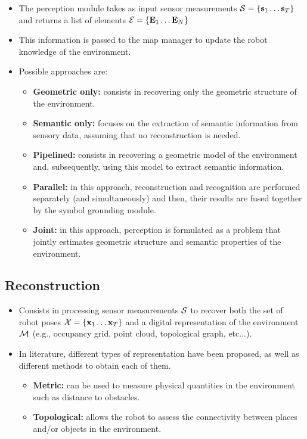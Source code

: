 \documentclass{article}
\begin{document}
%	

	\begin{itemize}
		\item The perception module takes as input sensor measurements $\mathcal{S} = \{ \mathbf{s}_1 \dots \mathbf{s}_T \}$ and returns a list of elements $\mathcal{E} = \{ \mathbf{E}_1 \dots \mathbf{E}_N \}$
		
		\item This information is passed to the map manager to update the robot knowledge of the environment.
		
		\item 	Possible approaches are:
		\begin{itemize}
			\item {\bf Geometric only:} consists in recovering only the geometric structure of the environment.
			\item {\bf Semantic only:} focuses on the extraction of semantic information from sensory data, assuming that no reconstruction is needed.
			\item {\bf Pipelined:} consists in recovering a geometric model of the environment and, subsequently, using this model to extract semantic information.
			\item {\bf Parallel:} in this approach, reconstruction and recognition are performed separately (and simultaneously) and then, their results are fused together by the symbol grounding module.
			\item {\bf Joint:} in this approach, perception is formulated as a problem that jointly estimates geometric structure and semantic properties of the environment. 
		\end{itemize}
	\end{itemize}
	
	\subsection{Reconstruction}

	\begin{itemize}
		\item Consists in processing sensor measurements $\mathcal{S}$ to recover both the set of robot poses $\mathcal{X} = \{ \mathbf{x}_1 \dots \mathbf{x}_T \}$ and a digital representation of the environment $\mathcal{M}$ (e.g., occupancy grid, point cloud, topological graph, etc...).
		\item 	In literature,  different types of representation have been proposed, as well as different methods to obtain each of them.
		\begin{itemize}
			\item {\bf Metric:} can be used to measure physical quantities in the environment such as distance to obstacles.
			\item {\bf Topological:} allows the robot to assess the connectivity between places and/or objects in the environment.
		\end{itemize}
	\end{itemize}	
		
\end{document}
